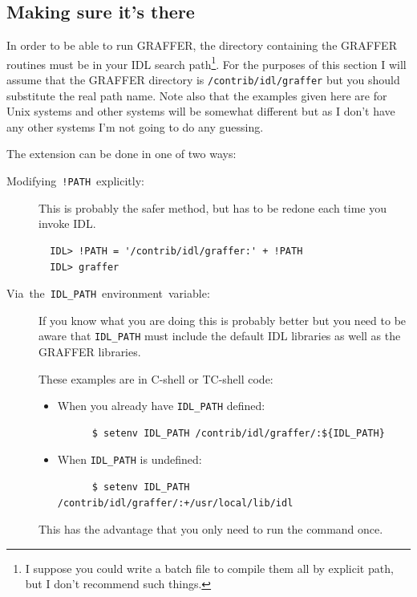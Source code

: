 \documentclass[11pt,twoside,english]{article}
\begin{document}
\subsection{Making sure it's there}

In order to be able to run GRAFFER, the directory containing the
GRAFFER routines must be in your IDL search path\footnote{I suppose you
  could write a batch file to compile them all by explicit path, but I
  don't recommend such things.}. For the purposes of this section I
will assume that the GRAFFER directory is \texttt{/contrib/idl/graffer}
but you should substitute the real path name. Note also that the
examples given here are for Unix systems and other systems will be
somewhat different but as I don't have any other systems I'm not going
to do any guessing.

The extension can be done in one of two ways:

\begin{description}
\item [Modifying~\texttt{!PATH}~explicitly:]This is probably the safer
  method, but has to be redone each time you invoke IDL.
\begin{verbatim}
  IDL> !PATH = '/contrib/idl/graffer:' + !PATH
  IDL> graffer
\end{verbatim}

\item [Via~the~\texttt{IDL\_PATH}~environment~variable:]If you know
  what you are doing this is probably better but you need to be aware
  that \texttt{IDL\_PATH} must include the default IDL libraries as
  well as the GRAFFER libraries.


  These examples are in C-shell or TC-shell code:

  \begin{itemize}
  \item When you already have \texttt{IDL\_PATH} defined:
    \begin{verbatim}
      $ setenv IDL_PATH /contrib/idl/graffer/:${IDL_PATH}
    \end{verbatim}
  \item When \texttt{IDL\_PATH} is undefined:
    \begin{verbatim}
      $ setenv IDL_PATH /contrib/idl/graffer/:+/usr/local/lib/idl
    \end{verbatim}
  \end{itemize}
  This has the advantage that you only need to run the command once.

\end{description}
\end{document}
